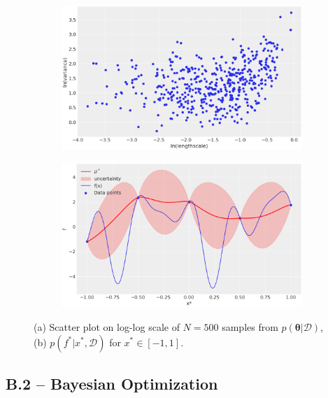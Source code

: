 \begin{figure}[H]
        \centering
        \begin{subfigure}[b]{0.475\textwidth}
            \centering
            \includegraphics[width=\textwidth]{src/loglogplot.png}
            \caption{}
            \label{fig:loglog}
        \end{subfigure}
        \hfill
        \begin{subfigure}[b]{0.475\textwidth}  
            \centering 
            \includegraphics[width=\textwidth]{src/posteriorpred.png}
            \caption{}
            \label{fig:postpred}
        \end{subfigure}
        \caption[]
        {(a) Scatter plot on log-log scale of $N=500$ samples from $p(\bm{\theta}|\mathcal{D})$, (b) $p(f^*|x^*,\mathcal{D})$ for $x^*\in[-1, 1]$.} 
        \label{fig:targetsmulti}
    \end{figure}


\subsection*{B.2 – Bayesian Optimization}

